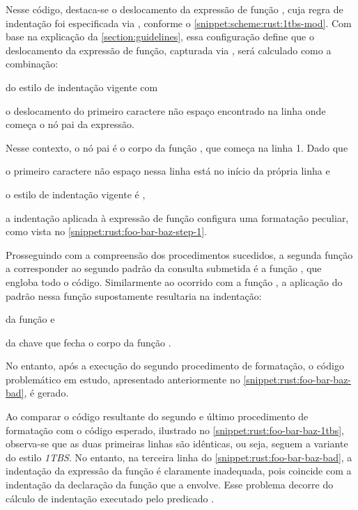 \documentclass
  [11pt,a4paper,english,brazil,openright,sumario=tradicional,twoside]
  {abntex2}
\begin{document}
  Nesse código, destaca-se o deslocamento da expressão de função
  , cuja regra de indentação foi especificada
  via , conforme o
  \cref{snippet:scheme:rust:1tbs-mod}. Com base na explicação da
  \cref{section:guidelines}, essa configuração define que o deslocamento da
  expressão de função, capturada via , será calculado
  como a combinação:
  \begin{inparaenum}
    \item do estilo de indentação vigente com
    \item o deslocamento do primeiro caractere não espaço encontrado na linha
          onde começa o nó pai da expressão.
  \end{inparaenum}
  Nesse contexto, o nó pai é o corpo da função , que
  começa na linha 1. Dado que
  \begin{inparaenum}
    \item o primeiro caractere não espaço nessa linha está no início da própria
          linha e
    \item o estilo de indentação vigente é ,
  \end{inparaenum}
  a indentação aplicada à expressão de função 
  configura uma formatação peculiar, como vista no
  \cref{snippet:rust:foo-bar-baz-step-1}.

  Prosseguindo com a compreensão dos procedimentos sucedidos, a segunda função
  a corresponder ao segundo padrão da consulta submetida é a função
  , que engloba todo o código. Similarmente ao ocorrido
  com a função , a aplicação do padrão nessa função
  supostamente resultaria na indentação:
  \begin{inparaenum}
    \item da função  e
    \item da chave que fecha o corpo da função .
  \end{inparaenum}
  No entanto, após a execução do segundo procedimento de formatação, o código
  problemático em estudo, apresentado anteriormente no
  \cref{snippet:rust:foo-bar-baz-bad}, é gerado.

  Ao comparar o código resultante do segundo e último procedimento de
  formatação com o código esperado, ilustrado no
  \cref{snippet:rust:foo-bar-baz-1tbs}, observa-se que as duas primeiras linhas
  são idênticas, ou seja, seguem a variante do estilo \textit{1TBS}. No
  entanto, na terceira linha do \cref{snippet:rust:foo-bar-baz-bad}, a
  indentação da expressão da função  é
  claramente inadequada, pois coincide com a indentação da declaração da função
  que a envolve. Esse problema decorre do cálculo de indentação executado pelo
  predicado .
\end{document}
